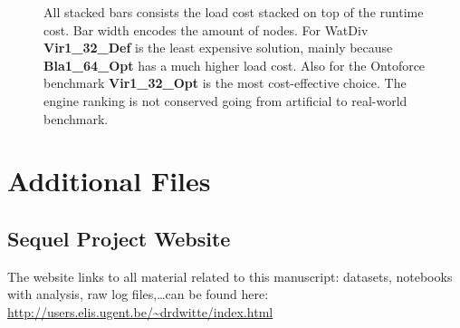 \documentclass[twocolumn]{bmcart}%
\def\texttt{[image: ]}
\begin{document}
\begin{backmatter}
\begin{figure}[ht!]
	\centering
	\caption{ All stacked bars consists the load cost stacked on top of the runtime cost. Bar width encodes the amount of nodes. For WatDiv \textbf{Vir1\_32\_Def} is the least expensive solution, mainly because \textbf{Bla1\_64\_Opt} has a much higher load cost. Also for the Ontoforce benchmark\textbf{ Vir1\_32\_Opt} is the most cost-effective choice. The engine ranking is not conserved going from artificial to real-world benchmark.}
	\label{fig:Fig11_AllSims_Correct}
\end{figure}




\section*{Additional Files}
  \subsection*{Sequel Project Website}
    The website links to all material related to this manuscript: datasets, notebooks with analysis, raw log files,\ldots can be found here: \url{http://users.elis.ugent.be/~drdwitte/index.html}


\end{backmatter}
\end{document}
